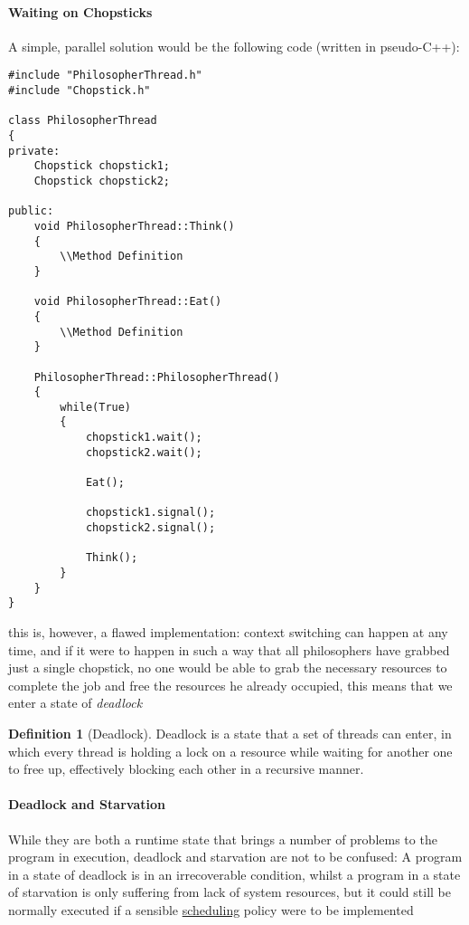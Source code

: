 \documentclass[openright, twoside]{report}
\theoremstyle{definition}
\newtheorem{definition}{Definition}[section]
\theoremstyle{example}
\begin{document}
		\paragraph{Waiting on Chopsticks}
		A simple, parallel solution would be the following code (written in pseudo-C++):

		\vspace{1cm}

		\begin{lstlisting}
#include "PhilosopherThread.h"
#include "Chopstick.h"

class PhilosopherThread
{
private:
	Chopstick chopstick1;
	Chopstick chopstick2;
	
public:
	void PhilosopherThread::Think()
	{
		\\Method Definition
	}

	void PhilosopherThread::Eat()
	{
		\\Method Definition
	}

	PhilosopherThread::PhilosopherThread()
	{
		while(True)
		{
			chopstick1.wait();
			chopstick2.wait();
	
			Eat();
	
			chopstick1.signal();
			chopstick2.signal();
	
			Think();
		}
	}
}
		\end{lstlisting}

		\vspace{1cm}

		this is, however, a flawed implementation: context switching can happen at any time, and if it were to happen in such a way 
		that all philosophers have grabbed just a single chopstick, no one would be able to grab the necessary resources to complete the 
		job and free the resources he already occupied, this means that we enter a state of \emph{deadlock}

		\label{sec:deadlock}
		\begin{definition}[Deadlock]
			Deadlock is a state that a set of threads can enter, in which every thread is holding a lock on a 
			resource while waiting for another one to free up, effectively blocking each other in a recursive manner.
		\end{definition}

		\paragraph{Deadlock and Starvation}
		While they are both a runtime state that brings a number of problems to the program in execution, deadlock and starvation are not to be confused:
		A program in a state of deadlock is in an irrecoverable condition, whilst a program in a state of starvation is only suffering from lack of 
		system resources, but it could still be normally executed if a sensible \hyperref[sec:scheduling]{scheduling} policy were to be implemented
\end{document}
